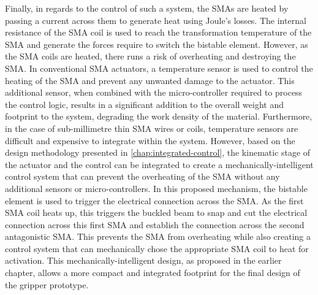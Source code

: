 Finally, in regards to the control of such a system, the SMAs are heated by passing a current across them to generate heat using Joule's losses. The internal resistance of the SMA coil is used to reach the transformation temperature of the SMA and generate the forces require to switch the bistable element. However, as the SMA coils are heated, there runs a risk of overheating and destroying the SMA. In conventional SMA actuators, a temperature sensor is used to control the heating of the SMA and prevent any unwanted damage to the actuator. This additional sensor, when combined with the micro-controller required to process the control logic, results in a significant addition to the overall weight and footprint to the system, degrading the work density of the material. Furthermore, in the case of sub-millimetre thin SMA wires or coils, temperature sensors are difficult and expensive to integrate within the system. However, based on the design methodology presented in \cref{chap:integrated-control}, the kinematic stage of the actuator and the control can be integrated to create a mechanically-intelligent control system that can prevent the overheating of the SMA without any additional sensors or micro-controllers. In this proposed mechanism, the bistable element is used to trigger the electrical connection across the SMA. As the first SMA coil heats up, this triggers the buckled beam to snap and cut the electrical connection across this first SMA and establish the connection across the second antagonistic SMA. This prevents the SMA from overheating while also creating a control system that can mechanically chose the appropriate SMA coil to heat for activation. This mechanically-intelligent design, as proposed in the earlier chapter, allows a more compact and integrated footprint for the final design of the gripper prototype.


